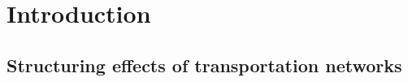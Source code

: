 \documentclass[11pt]{article}
\begin{document}
%







%
%
%
%
% 
%
%


\section{Introduction}

\subsection{Structuring effects of transportation networks}
\end{document}
